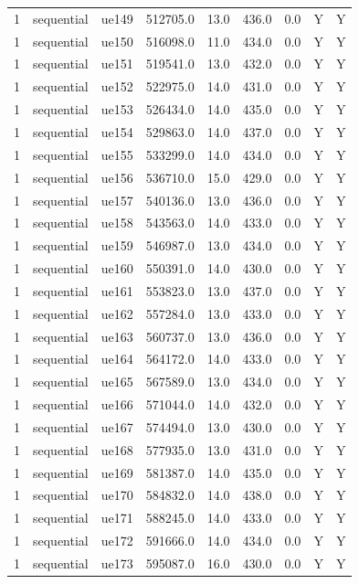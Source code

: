 \begin{table}[ht]
\begin{tabular}{|c|c|c|c|c|c|c|c|c|}
1 & sequential & ue149 & 512705.0 & 13.0 & 436.0 & 0.0 & Y & Y \\
1 & sequential & ue150 & 516098.0 & 11.0 & 434.0 & 0.0 & Y & Y \\
1 & sequential & ue151 & 519541.0 & 13.0 & 432.0 & 0.0 & Y & Y \\
1 & sequential & ue152 & 522975.0 & 14.0 & 431.0 & 0.0 & Y & Y \\
1 & sequential & ue153 & 526434.0 & 14.0 & 435.0 & 0.0 & Y & Y \\
1 & sequential & ue154 & 529863.0 & 14.0 & 437.0 & 0.0 & Y & Y \\
1 & sequential & ue155 & 533299.0 & 14.0 & 434.0 & 0.0 & Y & Y \\
1 & sequential & ue156 & 536710.0 & 15.0 & 429.0 & 0.0 & Y & Y \\
1 & sequential & ue157 & 540136.0 & 13.0 & 436.0 & 0.0 & Y & Y \\
1 & sequential & ue158 & 543563.0 & 14.0 & 433.0 & 0.0 & Y & Y \\
1 & sequential & ue159 & 546987.0 & 13.0 & 434.0 & 0.0 & Y & Y \\
1 & sequential & ue160 & 550391.0 & 14.0 & 430.0 & 0.0 & Y & Y \\
1 & sequential & ue161 & 553823.0 & 13.0 & 437.0 & 0.0 & Y & Y \\
1 & sequential & ue162 & 557284.0 & 13.0 & 433.0 & 0.0 & Y & Y \\
1 & sequential & ue163 & 560737.0 & 13.0 & 436.0 & 0.0 & Y & Y \\
1 & sequential & ue164 & 564172.0 & 14.0 & 433.0 & 0.0 & Y & Y \\
1 & sequential & ue165 & 567589.0 & 13.0 & 434.0 & 0.0 & Y & Y \\
1 & sequential & ue166 & 571044.0 & 14.0 & 432.0 & 0.0 & Y & Y \\
1 & sequential & ue167 & 574494.0 & 13.0 & 430.0 & 0.0 & Y & Y \\
1 & sequential & ue168 & 577935.0 & 13.0 & 431.0 & 0.0 & Y & Y \\
1 & sequential & ue169 & 581387.0 & 14.0 & 435.0 & 0.0 & Y & Y \\
1 & sequential & ue170 & 584832.0 & 14.0 & 438.0 & 0.0 & Y & Y \\
1 & sequential & ue171 & 588245.0 & 14.0 & 433.0 & 0.0 & Y & Y \\
1 & sequential & ue172 & 591666.0 & 14.0 & 434.0 & 0.0 & Y & Y \\
1 & sequential & ue173 & 595087.0 & 16.0 & 430.0 & 0.0 & Y & Y \\

\end{tabular}
\end{table}
